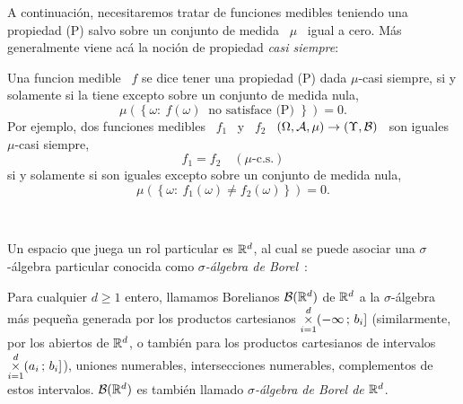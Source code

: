 A  continuaci\'on,  necesitaremos  tratar  de funciones  medibles  teniendo  una
propiedad (P) salvo sobre  un conjunto de medida \ $\mu$ \  igual a cero.  M\'as
generalmente viene ac\'a la noci\'on de propiedad {\it casi siempre}:
%
\begin{definicion}
\label{Def:MP:CasiSiempre}
%
  Una funcion  medible \  $f$ se  dice tener una  propiedad (P)  dada $\mu$-casi
  siempre, si y solamente si la tiene excepto sobre un conjunto de medida nula,
  \[
  \mu\left( \left\{ \omega:  \: f(\omega) \: \mbox{ no  satisface (P) } \right\}
  \right) = 0.
  \]
  Por ejemplo, dos funciones medibles \ $f_1$ \ y \ $f_2$ \ $(\Omega,\mathcal{A},\mu) \to
  (\Upsilon,\mathcal{B})$ \ son iguales $\mu$-casi siempre,
  \[
  f_1 = f_2 \quad (\mu\mbox{-c.s.})
  \]
  si y solamente si son iguales excepto sobre un conjunto de medida nula,
  \[
  \mu\left( \left\{ \omega: \: f_1(\omega) \ne f_2(\omega) \right\} \right) = 0.
  \]
\end{definicion}

\

Un espacio  que juega un rol particular  es $\mathbb{R}^d$, al cual  se puede asociar
una  $\sigma$-\'algebra  particular  conocida  como {\it  $\sigma$-\'algebra  de
  Borel}~\cite{AthLah06, Bog07:v1, Bog07:v2, Coh13}:
%
\begin{definicion}
\label{Def:MP:Borelianos}
%
  Para  cualquier  $d  \ge  1$  entero,  llamamos  Borelianos  $\mathcal{B}(\mathbb{R}^d)$  de
  $\mathbb{R}^d$ a  la $\sigma$-\'algebra m\'as peque\~na generada  por los productos
  cartesianos   $\displaystyle   \operatorname*{\times}_{i=1}^d  (-\infty   \,   ;  \,   b_i]$
  \big(similarmente,  por  los  abiertos  de  $\mathbb{R}^d$, o  tambi\'en  para  los
  productos cartesianos de intervalos  $\displaystyle \operatorname*{\times}_{i=1}^d (a_i \, ;
  \, b_i]$\big), \ie uniones numerables, intersecciones numerables, complementos
  de    estos   intervalos.    $\mathcal{B}(\mathbb{R}^d)$    es   tambi\'en    llamado   {\it
    $\sigma$-\'algebra de Borel de $\mathbb{R}^d$}.
\end{definicion}

\

